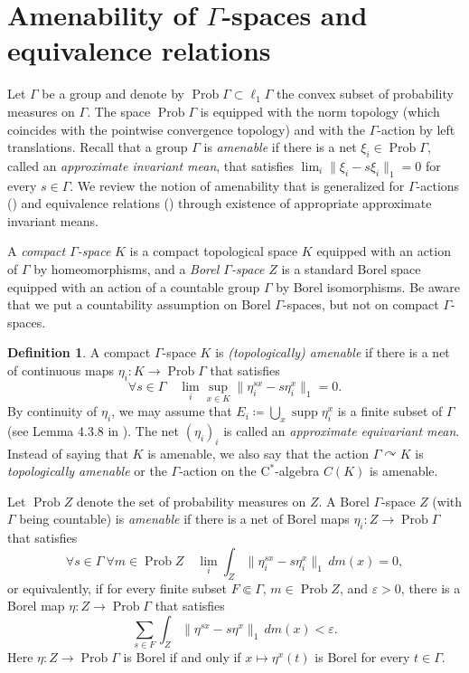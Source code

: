 \documentclass[12pt,nosumlimits,nonamelimits]{amsart}
\theoremstyle{remark}
\theoremstyle{definition}
\newtheorem{defn}[thm]{Definition}
\newcommand{\rC}{\mathrm{C}}
\newcommand{\ve}{\varepsilon}
\newcommand{\Ga}{\Gamma}
\newcommand{\acts}{\curvearrowright}
\DeclareMathOperator{\Prob}{Prob}
\DeclareMathOperator{\supp}{supp}
\newcommand{\cst}{$\rC^*$-alge\-bra}
\begin{document}
\section{Amenability of $\Ga$-spaces and equivalence relations}\label{sec:amen}
%
% 
Let $\Ga$ be a group and denote by 
$\Prob\Ga \subset \ell_1\Ga$ 
the convex subset of probability measures on $\Ga$. 
The space $\Prob\Ga$ is 
equipped with the norm topology 
(which coincides with the pointwise convergence topology) and with 
the $\Ga$-action by left translations. 
Recall that a group $\Ga$ is \emph{amenable} if there is 
a net $\xi_i\in\Prob\Ga$, 
called an \emph{approximate invariant mean}, that 
satisfies 
$\lim_i \|\xi_i - s\xi_i\|_1=0$ for every $s\in\Ga$. 
We review the notion of amenability that is generalized 
for $\Ga$-actions (\cite{anantharaman-delaroche,adr}) 
and equivalence relations (\cite{jkl}) through 
existence of appropriate approximate invariant means.

A \emph{compact $\Ga$-space} $K$ 
is a compact topological space $K$ 
equipped with an action of $\Ga$ by homeomorphisms, 
and a \emph{Borel $\Ga$-space} $Z$ is a 
standard Borel space equipped 
with an action of a countable group 
$\Ga$ by Borel isomorphisms. 
Be aware that we put a countability assumption 
on Borel $\Ga$-spaces, but not on compact $\Ga$-spaces. 

\begin{defn}\label{def:topoamen}
A compact $\Ga$-space $K$ is \emph{(topologically) amenable} 
if there is a net 
of continuous maps $\eta_i\colon K\to\Prob\Ga$ that satisfies 
\[
\forall s\in\Ga\quad \lim_i \sup_{x\in K} \| \eta_i^{sx} - s\eta_i^x \|_1 = 0. 
\] 
By continuity of $\eta_i$, we may assume that 
$E_i \coloneq \bigcup_x \supp\eta_i^x$ is a finite subset of $\Ga$ 
(see Lemma 4.3.8 in \cite{bo}). 
The net $(\eta_i)_i$ is called an \emph{approximate equivariant mean}. 
Instead of saying that $K$ is amenable, 
we also say that the action $\Ga\acts K$ 
is \emph{topologically amenable} 
or the $\Ga$-action on the \cst{} $C(K)$ is amenable. 

Let $\Prob Z$ denote the set of probability measures on $Z$. 
A Borel $\Ga$-space $Z$ (with $\Ga$ being countable) 
is \emph{amenable} if there is a net of 
Borel maps $\eta_i\colon Z\to\Prob \Ga$ 
that satisfies 
\[
\forall s\in\Ga\ \forall m\in \Prob Z\quad \lim_i \int_Z \| \eta_i^{sx} - s\eta_i^x \|_1\,dm(x) = 0, 
\]
or equivalently, if for every finite 
subset $F\Subset\Ga$, $m\in \Prob Z$, and $\ve>0$, 
there is a Borel map $\eta\colon Z\to\Prob \Ga$ that satisfies
\[
\sum_{s\in F}\int_Z \| \eta^{sx} - s\eta^x \|_1\,dm(x) < \ve. 
\]
Here $\eta\colon Z\to\Prob \Ga$ is Borel if and only if 
$x\mapsto\eta^x(t)$ is Borel for every $t\in\Ga$.
\end{defn}
\end{document}
